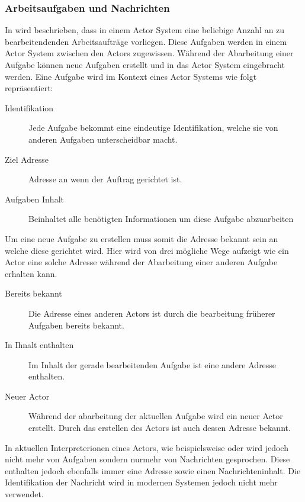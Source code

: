 \subsubsection{Arbeitsaufgaben und Nachrichten}\label{actors:messages}
In \cite{Agha1985ActorsSystems} wird beschrieben, dass in einem Actor System eine beliebige Anzahl an zu bearbeitendenden Arbeitsaufträge vorliegen. Diese Aufgaben werden in einem Actor System zwischen den Actors zugewissen. Während der Abarbeitung einer Aufgabe können neue Aufgaben erstellt und in das Actor System eingebracht werden. Eine Aufgabe wird im Kontext eines Actor Systems wie folgt repräsentiert:
\begin{description}
    \item[Identifikation] Jede Aufgabe bekommt eine eindeutige Identifikation, welche sie von anderen Aufgaben unterscheidbar macht.
    \item[Ziel Adresse] Adresse an wenn der Auftrag gerichtet ist.
    \item[Aufgaben Inhalt] Beinhaltet alle benötigten Informationen um diese Aufgabe abzuarbeiten
\end{description} 
Um eine neue Aufgabe zu erstellen muss somit die Adresse bekannt sein an welche diese gerichtet wird. Hier wird von \cite{Agha1985ActorsSystems} drei mögliche Wege aufzeigt wie ein Actor eine solche Adresse während der Abarbeitung einer anderen Aufgabe erhalten kann.
\begin{description}
    \item[Bereits bekannt] Die Adresse eines anderen Actors ist durch die bearbeitung früherer Aufgaben bereits bekannt.
    \item[In Ihnalt enthalten] Im Inhalt der gerade bearbeitenden Aufgabe ist eine andere Adresse enthalten.
    \item[Neuer Actor] Während der abarbeitung der aktuellen Aufgabe wird ein neuer Actor erstellt. Durch das erstellen des Actors ist auch dessen Adresse bekannt.
\end{description}
In aktuellen Interpreterionen eines Actors, wie beispielsweise \cite{Vernon2015ReactiveAkka} oder \cite{Brown2016ReactiveAkka.net.} wird jedoch nicht mehr von Aufgaben sondern nurmehr von Nachrichten gesprochen. Diese enthalten jedoch ebenfalls immer eine Adresse sowie einen Nachrichteninhalt. Die Identifikation der Nachricht wird in modernen Systemen jedoch nicht mehr verwendet. \\
